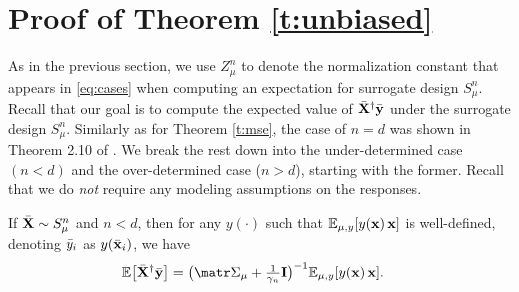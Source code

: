 \documentclass[../../thesis.tex]{subfiles}
\begin{document}
\section{Proof of Theorem \ref{t:unbiased}}
\label{s:unbiased-proof}

As in the previous section, we use $Z_\mu^n$ to denote the normalization
constant that appears in \eqref{eq:cases} when computing an expectation
for surrogate design $S_\mu^n$.
Recall that our goal is to compute the expected value of
${\bar{\mathbf X}}^\dagger\bar{\mathbf y}$ under the surrogate design $S_\mu^n$. Similarly as for Theorem
\ref{t:mse}, the case of $n=d$ was shown in Theorem 2.10 of
\cite{correcting-bias-journal}. We break the rest down into the
under-determined case $(n<d)$ and the over-determined case ($n>d$),
starting with the former. Recall that we do \emph{not} require any
modeling assumptions on the responses.
\begin{lemma}\label{l:ridge-under}
  If ${\bar{\mathbf X}}\sim S_\mu^n$ and $n<d$, then for any $y(\cdot)$
  such that $\mathbb E_{\mu,y}[y(\mathbf x)\,\mathbf x]$ is well-defined,
  denoting ${\bar y}_i$ as $y(\bar{\mathbf x}_i)$, we have
  \begin{align*}
    \E\big[\Xb^\dagger \ybb\big]
     & =
    \big(\Sigmab_\mu+\tfrac1{\gamma_n}\I\big)^{-1}\E_{\mu,y}[y(\x)\,\x].
  \end{align*}
\end{lemma}
\end{document}
